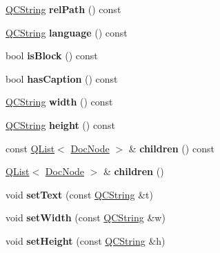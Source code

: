 \begin{DoxyCompactItemize}
\mbox{\label{class_doc_verbatim_ab9d8c60112cd8bfa12498c07d528b2f6}} 
\mbox{\hyperlink{class_q_c_string}{Q\+C\+String}} {\bfseries rel\+Path} () const
\item 
\mbox{\label{class_doc_verbatim_a330cfad3caad6395b0afe3ebbf7d3dcf}} 
\mbox{\hyperlink{class_q_c_string}{Q\+C\+String}} {\bfseries language} () const
\item 
\mbox{\label{class_doc_verbatim_a52966dec2b3158261a05706d39516e98}} 
bool {\bfseries is\+Block} () const
\item 
\mbox{\label{class_doc_verbatim_a2f48fffda3a45f9f6127aa1cc1642cf0}} 
bool {\bfseries has\+Caption} () const
\item 
\mbox{\label{class_doc_verbatim_ae68d4f3d6bdd5787627a0b7f4e44d3c2}} 
\mbox{\hyperlink{class_q_c_string}{Q\+C\+String}} {\bfseries width} () const
\item 
\mbox{\label{class_doc_verbatim_a1fd8c264ec55a734efd2f2ab890ef5d4}} 
\mbox{\hyperlink{class_q_c_string}{Q\+C\+String}} {\bfseries height} () const
\item 
\mbox{\label{class_doc_verbatim_aec0e4f1a490787791fe5adbfb0a78fae}} 
const \mbox{\hyperlink{class_q_list}{Q\+List}}$<$ \mbox{\hyperlink{class_doc_node}{Doc\+Node}} $>$ \& {\bfseries children} () const
\item 
\mbox{\label{class_doc_verbatim_a425864e094bd6f5e27956fcf16c5f628}} 
\mbox{\hyperlink{class_q_list}{Q\+List}}$<$ \mbox{\hyperlink{class_doc_node}{Doc\+Node}} $>$ \& {\bfseries children} ()
\item 
\mbox{\label{class_doc_verbatim_adeaf27e33a2f7b1bbad7a4145b552ebe}} 
void {\bfseries set\+Text} (const \mbox{\hyperlink{class_q_c_string}{Q\+C\+String}} \&t)
\item 
\mbox{\label{class_doc_verbatim_a449e27f3608c2922c7148116dae5baf7}} 
void {\bfseries set\+Width} (const \mbox{\hyperlink{class_q_c_string}{Q\+C\+String}} \&w)
\item 
\mbox{\label{class_doc_verbatim_a80b5ab2b1553cc50dd73bc3fecdddb3a}} 
void {\bfseries set\+Height} (const \mbox{\hyperlink{class_q_c_string}{Q\+C\+String}} \&h)
\end{DoxyCompactItemize}

